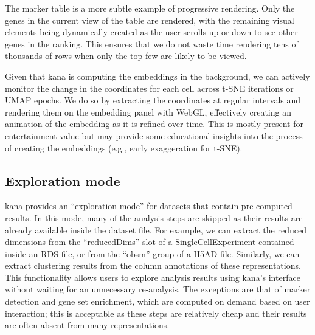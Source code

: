 \documentclass{article}
\begin{document}
The marker table is a more subtle example of progressive rendering.
Only the genes in the current view of the table are rendered, with the remaining visual elements being dynamically created as the user scrolls up or down to see other genes in the ranking.
This ensures that we do not waste time rendering tens of thousands of rows when only the top few are likely to be viewed.

Given that kana is computing the embeddings in the background, we can actively monitor the change in the coordinates for each cell across t-SNE iterations or UMAP epochs.
We do so by extracting the coordinates at regular intervals and rendering them on the embedding panel with WebGL,
effectively creating an animation of the embedding as it is refined over time.
This is mostly present for entertainment value but may provide some educational insights into the process of creating the embeddings (e.g., early exaggeration for t-SNE).

\subsection{Exploration mode}

kana provides an ``exploration mode'' for datasets that contain pre-computed results.
In this mode, many of the analysis steps are skipped as their results are already available inside the dataset file.
For example, we can extract the reduced dimensions from the ``reducedDims'' slot of a SingleCellExperiment contained inside an RDS file, or from the ``obsm'' group of a H5AD file.
Similarly, we can extract clustering results from the column annotations of these representations.
This functionality allows users to explore analysis results using kana's interface without waiting for an unnecessary re-analysis.
The exceptions are that of marker detection and gene set enrichment, which are computed on demand based on user interaction;
this is acceptable as these steps are relatively cheap and their results are often absent from many representations.

% 
\end{document}
